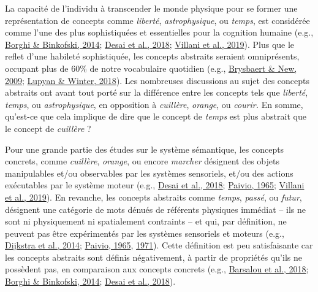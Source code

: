 \documentclass[
  a4paper,12pt,twoside,onecolumn,openright,final,oldfontcommands]{memoir}
\begin{document}
La capacité de l'individu à transcender le monde physique pour se former une représentation de concepts comme \emph{liberté}, \emph{astrophysique}, ou \emph{temps}, est considérée comme l'une des plus sophistiquées et essentielles pour la cognition humaine (e.g., \protect\hyperlink{ref-borghi_words_2014}{Borghi \& Binkofski, 2014}; \protect\hyperlink{ref-desai_multifaceted_2018}{Desai et al., 2018}; \protect\hyperlink{ref-villani_varieties_2019}{Villani et al., 2019}). Plus que le reflet d'une habileté sophistiquée, les concepts abstraits seraient omniprésents, occupant plus de 60\% de notre vocabulaire quotidien (e.g., \protect\hyperlink{ref-brysbaert_moving_2009}{Brysbaert \& New, 2009}; \protect\hyperlink{ref-lupyan_language_2018}{Lupyan \& Winter, 2018}). Les nombreuses discussions au sujet des concepts abstraits ont avant tout porté sur la différence entre les concepts tels que \emph{liberté}, \emph{temps}, ou \emph{astrophysique}, en opposition à \emph{cuillère}, \emph{orange}, ou \emph{courir.} En somme, qu'est-ce que cela implique de dire que le concept de \emph{temps} est plus abstrait que le concept de \emph{cuillère} ?

Pour une grande partie des études sur le système sémantique, les concepts concrets, comme \emph{cuillère}, \emph{orange}, ou encore \emph{marcher} désignent des objets manipulables et/ou observables par les systèmes sensoriels, et/ou des actions exécutables par le système moteur (e.g., \protect\hyperlink{ref-desai_multifaceted_2018}{Desai et al., 2018}; \protect\hyperlink{ref-paivio_abstractness_1965}{Paivio, 1965}; \protect\hyperlink{ref-villani_varieties_2019}{Villani et al., 2019}). En revanche, les concepts abstraits comme \emph{temps}, \emph{passé}, ou \emph{futur}, désignent une catégorie de mots dénués de référents physiques immédiat -- ils ne sont ni physiquement ni spatialement contraints -- et qui, par définition, ne peuvent pas être expérimentés par les systèmes sensoriels et moteurs (e.g., \protect\hyperlink{ref-dijkstra_embodied_2014}{Dijkstra et al., 2014}; \protect\hyperlink{ref-paivio_abstractness_1965}{Paivio, 1965}, \protect\hyperlink{ref-paivio_imagery_1971}{1971}). Cette définition est peu satisfaisante car les concepts abstraits sont définis négativement, à partir de propriétés qu'ils ne possèdent pas, en comparaison aux concepts concrets (e.g., \protect\hyperlink{ref-barsalou_moving_2018}{Barsalou et al., 2018}; \protect\hyperlink{ref-borghi_words_2014}{Borghi \& Binkofski, 2014}; \protect\hyperlink{ref-desai_multifaceted_2018}{Desai et al., 2018}).
\end{document}
